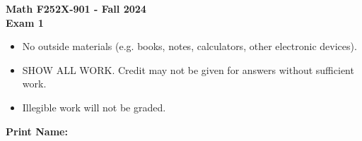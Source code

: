 \documentclass[addpoints,12pt]{exam}
\begin{document}
	
\begin{coverpages}
  \begin{center}
    \begin{center}
      \Large{\textbf{Math F252X-901 - Fall 2024}}\\
      \Large{\textbf{Exam 1}}\\
      \vspace{0.5in}
      \normalsize{\begin{itemize}
        \item No outside materials (e.g. books, notes, calculators,
          other electronic devices).
        \item SHOW ALL WORK. Credit may not be given for answers
          without sufficient work.
        \item Illegible work will not be graded.
        \end{itemize}}
    \end{center}
    \vspace{1in}
		\textbf{Print Name:}\underline{\hspace{4in}}\\
    \vspace{0.5in}
    \gradetable[v][pages]
  \end{center}
\end{coverpages}
\end{document}
